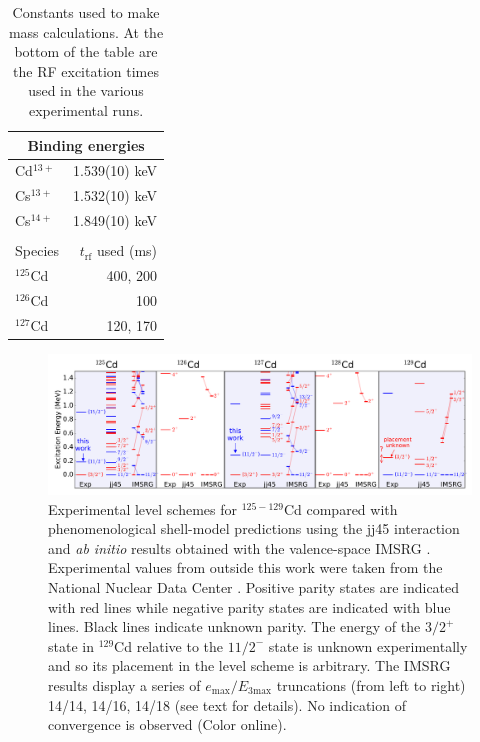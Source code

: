\documentclass[twocolumn,prc,showpacs,preprintnumbers,amsmath,amssymb,superscriptaddress,nofootinbib,aps,10pt]{revtex4-1}
\begin{document}
\begin{table}[ht]
\centering
\caption{Constants used to make mass calculations. At the bottom of the table are the RF excitation times used in the various experimental runs.}
\begin{tabular}{lr}
    \hline
    \multicolumn{2}{c}{Binding energies \cite{Rodrigues2004}} \\
    \hline
    Cd$^{13+}$ & 1.539(10) keV \\
    Cs$^{13+}$ & 1.532(10) keV \\
    Cs$^{14+}$ & 1.849(10) keV \\
    \hline \\
    \hline
    Species & $t_{\mathrm{rf}}$ used (ms) \\
    \hline
    $^{125}$Cd & 400, 200 \\
    $^{126}$Cd & 100 \\
    $^{127}$Cd & 120, 170 \\
    \hline
\end{tabular}
\label{table:constants}
\end{table}

\begin{figure}[ht]
    \begin{center}
        \includegraphics[width=\textwidth]{Cd_spectra_v2.pdf}
        \caption{Experimental level schemes for $^{125-129}$Cd compared with phenomenological shell-model predictions using the jj45 interaction \cite{Dillmann2003} and {\it ab initio} results obtained with the valence-space IMSRG \cite{Tsukiyama2012,Bogner2014,Stroberg2016,Stroberg2017}. Experimental values from outside this work were taken from the National Nuclear Data Center \cite{NNDC2016}. Positive parity states are indicated with red lines while negative parity states are indicated with blue lines. Black lines indicate unknown parity. The energy of the $3/2^+$ state in $^{129}$Cd relative to the $11/2^-$ state is unknown experimentally and so its placement in the level scheme is arbitrary. The IMSRG results display a series of $e_{\mathrm{max}}/E_{3\mathrm{max}}$ truncations (from left to right) 14/14, 14/16, 14/18 (see text for details). No indication of convergence is observed (Color online).}
        \label{fig:level}
    \end{center}
\end{figure}
\end{document}
